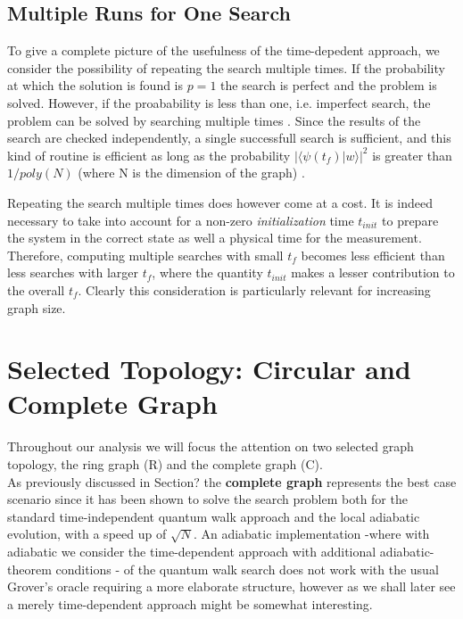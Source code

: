         \subsection{Multiple Runs for One Search}
        To give a complete picture of the usefulness of the time-depedent approach, we consider the possibility of repeating the search multiple times. If the probability at which the solution is found is $p=1$ the search is perfect and the problem is solved. However, if the proabability is less than one, i.e. imperfect search, the problem can be solved by searching multiple times . Since the results of the search are checked independently, a single successfull search is sufficient, and this kind of routine is efficient as long as the probability $\big|\langle\psi(t_f)| w\rangle\big|^2$ is greater than $1/poly(N)$ (where N is the dimension of the graph) \cite{Morley2018}.

        Repeating the search multiple times does however come at a cost. It is indeed necessary to take into account for a non-zero \textit{initialization} time $t_{init}$ to prepare the system in the correct state as well a physical time for the measurement. Therefore, computing multiple searches with small $t_f$ becomes less efficient than less searches with larger $t_f$, where the quantity $t_{init}$ makes a lesser contribution to the overall $t_f$. Clearly this consideration is particularly relevant for increasing graph size.

\section{Selected Topology: Circular and Complete Graph}
    Throughout our analysis we will focus the attention on two selected graph topology, the ring graph (R) and the complete graph (C). \\

    As previously discussed in Section? the \textbf{complete graph} represents the best case scenario since it has been shown to solve the search problem both for the standard time-independent quantum walk approach and the local adiabatic evolution, with a speed up of $\sqrt{N}$. An adiabatic implementation -where with adiabatic we consider the time-dependent approach with additional adiabatic-theorem conditions -  of the quantum walk search does not work with the usual Grover's oracle requiring a more elaborate structure, however as we shall later see a merely time-dependent approach might be somewhat interesting. \\

